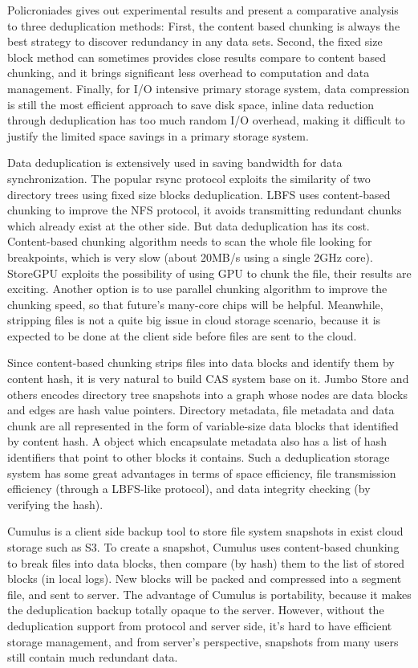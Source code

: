 Policroniades\cite{poli04} gives out
experimental results and present a comparative analysis
to three deduplication methods: First, the content based chunking
is always the best strategy to discover redundancy in any data sets.
Second, the fixed size block method can sometimes provides
close results compare to content based chunking, and it brings significant less
overhead to computation and data management. Finally, for I/O intensive primary storage system,
data compression is still the most efficient approach to save disk space,
inline data reduction through deduplication has too much random I/O overhead, making it difficult to
justify the limited space savings in a primary storage system.

Data deduplication is extensively used in saving bandwidth for data synchronization.
The popular rsync\cite{rsync} protocol exploits the similarity of two directory trees
using fixed size blocks deduplication.
LBFS uses content-based chunking to improve the NFS protocol,
it avoids transmitting redundant chunks which already exist at the other side.
But data deduplication has its cost. Content-based chunking algorithm needs to
scan the whole file looking for breakpoints, which is very slow (about 20MB/s using a single 2GHz core).
StoreGPU\cite{storegpu08}
exploits the possibility of using GPU to chunk the file,
their results are exciting. Another option is to use parallel
chunking algorithm to improve the chunking speed,
so that future's many-core chips will be helpful.
Meanwhile, stripping files is not a quite big issue in cloud storage scenario,
because it is expected to be done at the client side before files are
sent to the cloud.

Since content-based chunking strips files into data blocks
and identify them by content hash,
it is very natural to build CAS system base on it.
Jumbo Store and others\cite{jumbo07,efficient_dedup05,you06} encodes directory tree snapshots
into a graph whose nodes are data blocks and edges
are hash value pointers.
Directory metadata, file metadata and data chunk are all
represented in the form of variable-size data blocks that identified by content hash.
A object which encapsulate metadata also has a list of hash identifiers
that point to other blocks it contains.
Such a deduplication storage system has some great advantages
in terms of space efficiency, file transmission efficiency (through a LBFS-like protocol),
and data integrity checking (by verifying the hash).

Cumulus\cite{cumulus09} is a client side backup tool to store
file system snapshots in exist cloud storage such as S3.
To create a snapshot, Cumulus uses content-based chunking to break files into data blocks,
then compare (by hash) them to the list of stored blocks (in local logs).
New blocks will be packed and compressed into a segment file, and sent to server.
The advantage of Cumulus is portability, because it makes
the deduplication backup totally opaque to the server.
However, without the deduplication support from protocol and server side,
it's hard to have efficient storage management, and from server's perspective,
snapshots from many users still contain much redundant data.

